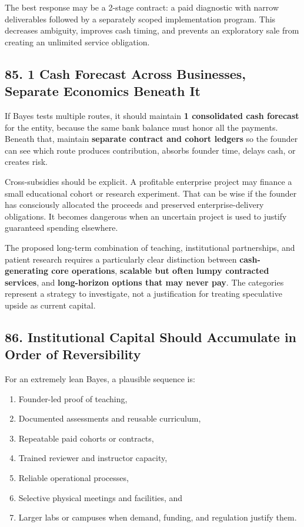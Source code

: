 The best response may be a 2-stage contract: a paid diagnostic with narrow deliverables followed by a separately scoped implementation program. This decreases ambiguity, improves cash timing, and prevents an exploratory sale from creating an unlimited service obligation.

\subsection*{85. 1 Cash Forecast Across Businesses, Separate Economics Beneath It}

If Bayes tests multiple routes, it should maintain \textbf{1 consolidated cash forecast} for the entity, because the same bank balance must honor all the payments. Beneath that, maintain \textbf{separate contract and cohort ledgers} so the founder can see which route produces contribution, absorbs founder time, delays cash, or creates risk.

Cross-subsidies should be explicit. A profitable enterprise project may finance a small educational cohort or research experiment. That can be wise if the founder has consciously allocated the proceeds and preserved enterprise-delivery obligations. It becomes dangerous when an uncertain project is used to justify guaranteed spending elsewhere.

The proposed long-term combination of teaching, institutional partnerships, and patient research requires a particularly clear distinction between \textbf{cash-generating core operations}, \textbf{scalable but often lumpy contracted services}, and \textbf{long-horizon options that may never pay}. The categories represent a strategy to investigate, not a justification for treating speculative upside as current capital.

\subsection*{86. Institutional Capital Should Accumulate in Order of Reversibility}

For an extremely lean Bayes, a plausible sequence is:
\begin{enumerate}
\item Founder-led proof of teaching,
\item Documented assessments and reusable curriculum,
\item Repeatable paid cohorts or contracts,
\item Trained reviewer and instructor capacity,
\item Reliable operational processes,
\item Selective physical meetings and facilities, and
\item Larger labs or campuses when demand, funding, and regulation justify them.
\end{enumerate}

